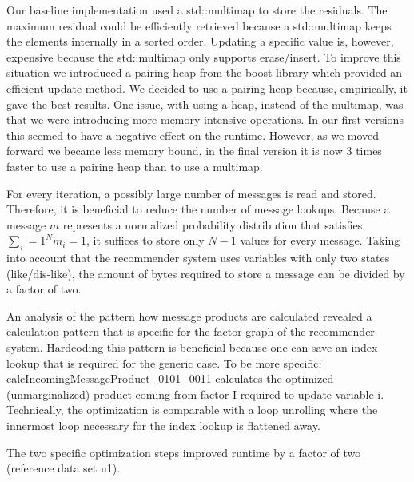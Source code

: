 Our baseline implementation used a std::multimap to store the residuals. The maximum residual could be efficiently retrieved because a std::multimap keeps the elements internally in a sorted order. Updating a specific value is, however, expensive because the std::multimap only supports erase/insert. To improve this situation we introduced a pairing heap from the boost library which provided an efficient update method. We decided to use a pairing heap because, empirically, it gave the best results. One issue, with using a heap, instead of the multimap, was that we were introducing more memory intensive operations. In our first versions this seemed to have a negative effect on the runtime. However, as we moved forward we became less memory bound, in the final version it is now 3 times faster to use a pairing heap than to use a multimap.

For every iteration, a possibly large number of messages is read and stored. Therefore, it is beneficial to reduce the number of message lookups. Because a message $m$ represents a normalized probability distribution that satisfies $\sum_i=1^N m_i = 1$, it suffices to store only $N-1$ values for every message. Taking into account that the recommender system uses variables with only two states (like/dis-like), the amount of bytes required to store a message can be divided by a factor of two. 

An analysis of the pattern how message products are calculated revealed a calculation pattern that is specific for the factor graph of the recommender system. Hardcoding this pattern is beneficial because one can save an index lookup that is required for the generic case. To be more specific: calcIncomingMessageProduct\_0101\_0011 calculates the optimized (unmarginalized) product coming from factor I required to update variable i. 
Technically, the optimization is comparable with a loop unrolling where the innermost loop necessary for the index lookup is flattened away.

The two specific optimization steps improved runtime by a factor of two (reference data set u1).

